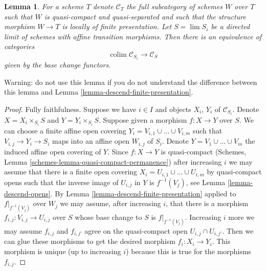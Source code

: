\documentclass{stacks-project}
\theoremstyle{plain}
\newtheorem{lemma}[subsection]{Lemma}
\theoremstyle{definition}
\theoremstyle{remark}
\numberwithin{equation}{subsection}
\def\lim{\mathop{\mathrm{lim}}\nolimits}
\def\colim{\mathop{\mathrm{colim}}\nolimits}
\begin{document}
\begin{lemma}
\label{lemma-descend-finite-presentation-variant}
For a scheme $T$ denote $\mathcal{C}_T$ the full subcategory of
schemes $W$ over $T$ such that $W$ is quasi-compact and quasi-separated
and such that the structure morphism $W \to T$ is
locally of finite presentation.
Let $S = \lim S_i$ be a directed limit of schemes with affine
transition morphisms. Then there is an equivalence
of categories
$$
\colim \mathcal{C}_{S_i} \longrightarrow \mathcal{C}_S
$$
given by the base change functors.
\end{lemma}

\noindent
Warning: do not use this lemma if you do not understand the difference
between this lemma and Lemma \ref{lemma-descend-finite-presentation}.

\begin{proof}
Fully faithfulness. Suppose we have $i \in I$ and objects
$X_i$, $Y_i$ of $\mathcal{C}_{S_i}$. Denote
$X = X_i \times_{S_i} S$ and $Y = Y_i \times_{S_i} S$.
Suppose given a morphism $f : X \to Y$ over $S$.
We can choose a finite affine open covering
$Y_i = V_{i, 1} \cup \ldots \cup V_{i, m}$
such that $V_{i, j} \to Y_i \to S_i$ maps into an affine
open $W_{i, j}$ of $S_i$. Denote $Y = V_1 \cup \ldots \cup V_m$ the
induced affine open covering of $Y$.
Since $f : X \to Y$ is quasi-compact
(Schemes, Lemma \ref{schemes-lemma-quasi-compact-permanence})
after increasing $i$ we may assume that there is a
finite open covering $X_i = U_{i, 1} \cup \ldots \cup U_{i, m}$
by quasi-compact opens such that the inverse image of
$U_{i, j}$ in $Y$ is $f^{-1}(V_j)$, see
Lemma \ref{lemma-descend-opens}.
By Lemma \ref{lemma-descend-finite-presentation}
applied to $f|_{f^{-1}(V_j)}$ over $W_j$ we may assume, after
increasing $i$, that there is a morphism
$f_{i, j} : V_{i, j} \to U_{i, j}$ over $S$ whose base change
to $S$ is $f|_{f^{-1}(V_j)}$.
Increasing $i$ more we may assume $f_{i, j}$ and $f_{i, j'}$
agree on the quasi-compact open $U_{i, j} \cap U_{i, j'}$.
Then we can glue these morphisms to get the
desired morphism $f_i : X_i \to Y_i$.
This morphism is unique (up to increasing $i$)
because this is true for the morphisms $f_{i, j}$.


\end{proof}
\end{document}
